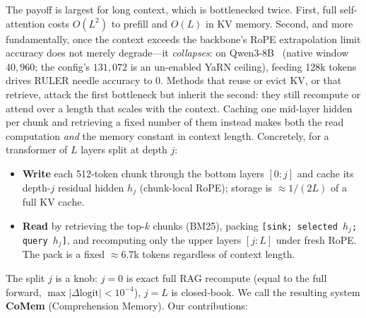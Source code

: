 The payoff is largest for long context, which is bottlenecked twice. First,
full self-attention costs $O(L^2)$ to prefill and $O(L)$ in KV memory. Second,
and more fundamentally, once the context exceeds the backbone's RoPE
extrapolation limit accuracy does not merely degrade---it \emph{collapses}: on
Qwen3-8B~\citep{qwen3} (native window $40{,}960$; the config's $131{,}072$ is an
un-enabled YaRN ceiling), feeding 128k tokens drives RULER needle accuracy to
$0$. Methods that reuse or evict KV, or that retrieve, attack the first
bottleneck but inherit the second: they still recompute or attend over a length
that scales with the context. Caching one mid-layer hidden per chunk and
retrieving a fixed number of them instead makes both the read computation
\emph{and} the memory constant in context length. Concretely, for a transformer
of $L$ layers split at depth $j$:
\begin{itemize}[leftmargin=1.2em,itemsep=1pt]
\item \textbf{Write} each 512-token chunk through the bottom layers $[0{:}j]$
and cache its depth-$j$ residual hidden $h_j$ (chunk-local RoPE); storage is
$\approx$$1/(2L)$ of a full KV cache.
\item \textbf{Read} by retrieving the top-$k$ chunks (BM25), packing
\texttt{[sink; selected $h_j$; query $h_j$]}, and recomputing only the upper
layers $[j{:}L]$ under fresh RoPE. The pack is a fixed $\approx$6.7k tokens
regardless of context length.
\end{itemize}
The split $j$ is a knob: $j{=}0$ is exact full RAG recompute (equal to the full
forward, $\max|\Delta\text{logit}|<10^{-4}$), $j{=}L$ is closed-book. We call
the resulting system \textbf{CoMem} (Comprehension Memory). Our contributions:
